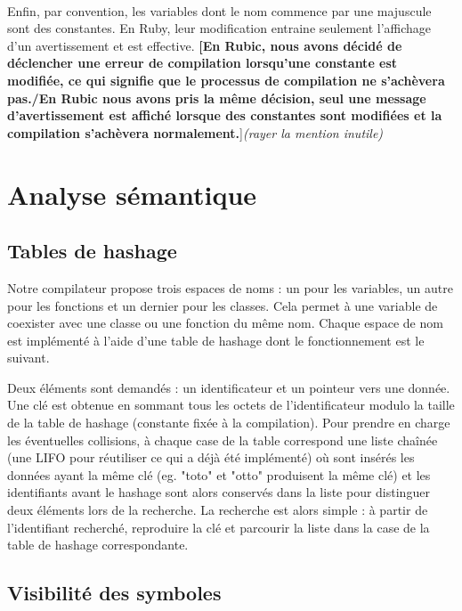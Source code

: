 \documentclass[12pt]{article}
\begin{document}
\paragraph{}
Enfin, par convention, les variables dont le nom commence par une majuscule
sont des constantes. En Ruby, leur modification entraine seulement l'affichage
d'un avertissement et est effective. \textbf{[En Rubic, nous avons décidé de
déclencher une erreur de compilation lorsqu'une constante est modifiée, ce qui
signifie que le processus de compilation ne s'achèvera pas.{\Large/}En
Rubic nous avons pris la même décision, seul une message d'avertissement est
affiché lorsque des constantes sont modifiées et la compilation s'achèvera
normalement.}]\emph{(rayer la mention inutile)}


\section{Analyse sémantique}

\subsection{Tables de hashage}

Notre compilateur propose trois espaces de noms : un pour les
variables, un autre pour les fonctions et un dernier pour les classes. Cela
permet à une variable de coexister avec une classe ou une fonction du même
nom. Chaque espace de nom est implémenté à l'aide d'une table de hashage dont
le fonctionnement est le suivant.

Deux éléments sont demandés : un identificateur et un pointeur vers une donnée.
Une clé est obtenue en sommant tous les octets de l'identificateur modulo la
taille de la table de hashage (constante fixée à la compilation). Pour prendre
en charge les éventuelles collisions, à chaque case de la table correspond une
liste chaînée (une LIFO pour réutiliser ce qui a déjà été implémenté) où sont
insérés les données ayant la même clé (eg. "toto" et "otto" produisent la même
clé) et les identifiants avant le hashage sont alors conservés dans la liste
pour distinguer deux éléments lors de la recherche. La recherche est alors
simple : à partir de l'identifiant recherché, reproduire la clé et parcourir
la liste dans la case de la table de hashage correspondante.


\subsection{Visibilité des symboles}
\end{document}

